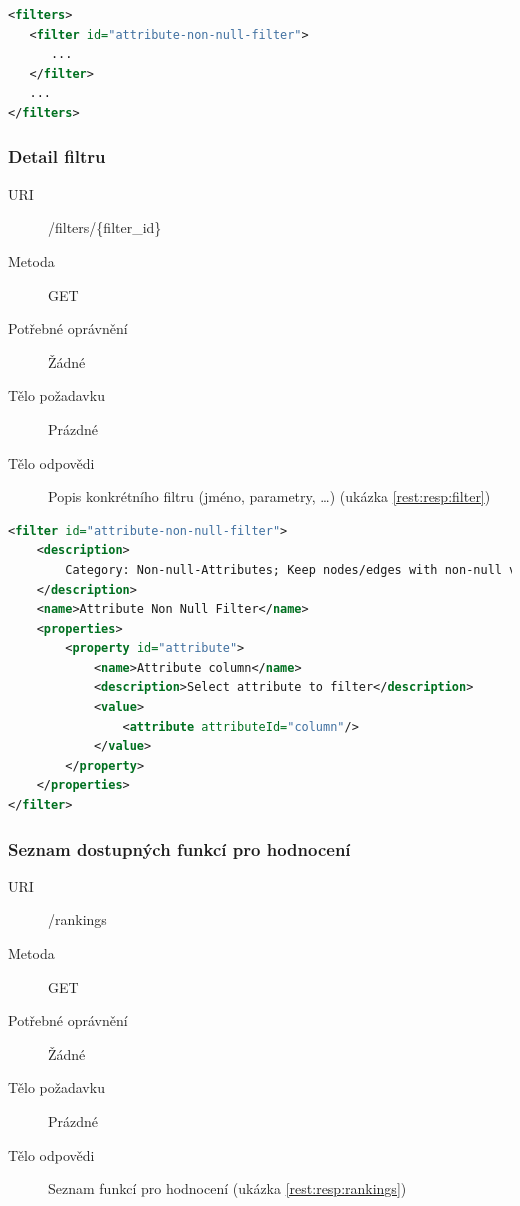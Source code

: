 \documentclass[thesis=M,czech]{FITthesis}[2014/05/6]
\begin{document}
\begin{lstlisting}[caption=Tělo odpovědi zdroje /filters (GET), label=rest:resp:filters, language=xml]
<filters>
   <filter id="attribute-non-null-filter">
      ...
   </filter>
   ...
</filters>
\end{lstlisting}  

\subsubsection{Detail filtru}
\begin{description}
  \item[URI] /filters/\{filter\_id\}
  \item[Metoda] GET
  \item[Potřebné oprávnění] Žádné
  \item[Tělo požadavku] Prázdné
  \item[Tělo odpovědi] Popis konkrétního filtru (jméno, parametry, \ldots) (ukázka \ref{rest:resp:filter})
\end{description}

\begin{lstlisting}[caption=Tělo odpovědi zdroje /fiters/\{filter\_id\} (GET), label=rest:resp:filter, language=xml]
<filter id="attribute-non-null-filter">
    <description>
        Category: Non-null-Attributes; Keep nodes/edges with non-null values for a particular column
    </description>
    <name>Attribute Non Null Filter</name>
    <properties>
        <property id="attribute">
            <name>Attribute column</name>
            <description>Select attribute to filter</description>
            <value>
                <attribute attributeId="column"/>
            </value>
        </property>
    </properties>    
</filter>
\end{lstlisting}  

\subsubsection{Seznam dostupných funkcí pro hodnocení}
\begin{description}
  \item[URI] /rankings
  \item[Metoda] GET
  \item[Potřebné oprávnění] Žádné
  \item[Tělo požadavku] Prázdné
  \item[Tělo odpovědi] Seznam funkcí pro hodnocení (ukázka \ref{rest:resp:rankings})
\end{description}
\end{document}
